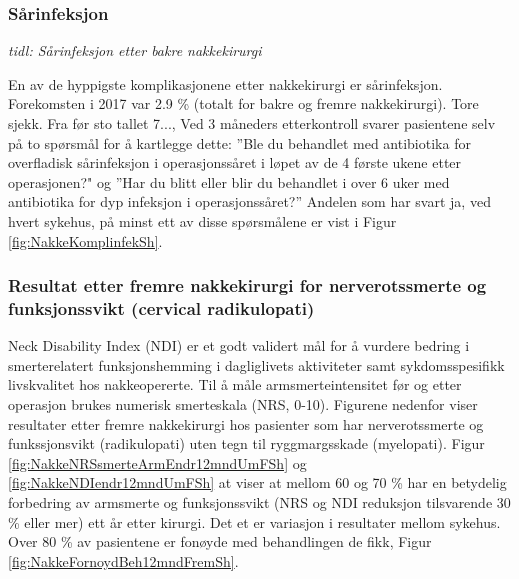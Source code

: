 \documentclass [norsk,a4paper,twoside]{article}\usepackage[]{graphicx}\usepackage[]{color}
\begin{document}
      \subsubsection{Sårinfeksjon }
      \textit{tidl: Sårinfeksjon etter bakre nakkekirurgi}
      

                  En av de hyppigste komplikasjonene etter nakkekirurgi er sårinfeksjon. Forekomsten i 2017 var 
            2.9 \% (totalt for bakre og fremre nakkekirurgi). 
            \large{Tore sjekk. Fra før sto tallet 7...}, 
            Ved  3 måneders etterkontroll svarer pasientene selv 
            på to spørsmål  for å kartlegge dette: ''Ble du behandlet med antibiotika for overfladisk sårinfeksjon i operasjonssåret i løpet av de 4 første ukene etter operasjonen?" og 
            ''Har du blitt eller blir du behandlet i over 6 uker med antibiotika for dyp infeksjon i operasjonssåret?''   Andelen som har svart ja, ved hvert sykehus, på minst ett av disse spørsmålene er vist i Figur \ref{fig:NakkeKomplinfekSh}.  
            
            
            
            \subsubsection{Resultat etter fremre nakkekirurgi for nerverotssmerte og funksjonssvikt (cervical radikulopati)}
            

            
            
            Neck Disability Index (NDI) er et godt validert mål for å vurdere bedring i smerterelatert
            funksjonshemming  i dagliglivets aktiviteter samt sykdomsspesifikk livskvalitet hos 
            nakkeopererte. Til å måle armsmerteintensitet før og etter operasjon brukes numerisk 
            smerteskala (NRS, 0-10). Figurene nedenfor viser resultater etter fremre nakkekirurgi hos 
            pasienter som har nerverotssmerte og funkssjonsvikt (radikulopati) uten tegn til 
            ryggmargsskade 
            (myelopati). Figur \ref{fig:NakkeNRSsmerteArmEndr12mndUmFSh} og  
            \ref{fig:NakkeNDIendr12mndUmFSh} at viser at mellom 60 og 70 \% har en betydelig forbedring av 
            armsmerte og funksjonssvikt (NRS og NDI reduksjon tilsvarende 30 \%  eller mer) ett år etter 
            kirurgi. Det et er variasjon i resultater mellom sykehus. Over 80 \% av pasientene er fonøyde 
            med behandlingen de fikk, Figur \ref{fig:NakkeFornoydBeh12mndFremSh}.  
            
\end{document}

